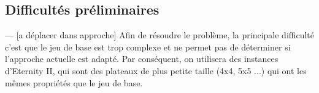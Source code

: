 	\subsection{Difficultés préliminaires}

--- [a déplacer dans approche]
	Afin de résoudre le problème, la principale difficulté c'est que le jeu de base est trop complexe et ne permet pas de déterminer si l'approche actuelle est adapté. Par conséquent, on utilisera des instances d'Eternity II, qui sont des plateaux de plus petite taille (4x4, 5x5 ...) qui ont les mêmes propriétés que le jeu de base.